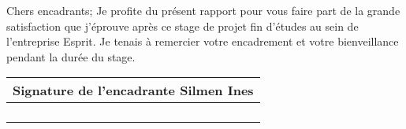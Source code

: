 \thispagestyle{empty}
\thispagestyle{empty}
\begin{center}
\ungaramond{\textbf{\LARGE\color{blue}{Signature}}}
\end{center}
\vspace{0.8cm}
Chers encadrants;
Je profite du présent rapport pour vous faire part de la grande satisfaction que j'éprouve après ce stage de projet fin d'études au sein de l'entreprise Esprit.
Je tenais à remercier votre encadrement et votre bienveillance pendant la durée du stage.
\newline
\newline
\newline
\newline

 \begin{tabular}{|l|}
  \hline
 Signature de l'encadrante Silmen Ines  \\
  \hline
     & \\
   &  \\
    &  \\
     &  \\
  \hline
\end{tabular}